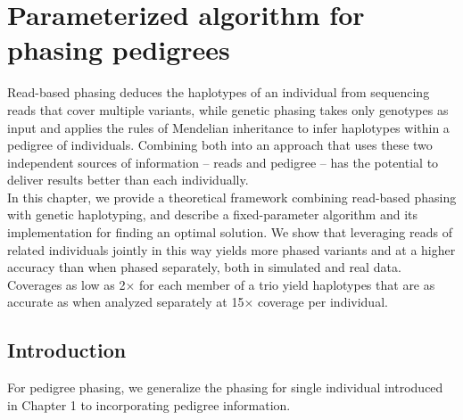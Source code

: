 \chapter{Parameterized algorithm for phasing pedigrees}
Read-based phasing deduces the haplotypes of an individual from sequencing reads that cover multiple variants, while genetic phasing takes only genotypes as input and applies the rules of Mendelian inheritance to infer haplotypes within a pedigree of individuals.
Combining both into an approach that uses these two independent sources of information -- reads and pedigree -- has the potential to deliver results better than each individually.\\

In this chapter, we provide a theoretical framework combining read-based phasing with genetic haplotyping, and describe a fixed-parameter algorithm and its implementation for finding an optimal solution.
We show that leveraging reads of related individuals jointly in this way yields more phased variants and at a higher accuracy than when phased separately, both in simulated and real data.
Coverages as low as 2$\times$ for each member of a trio yield haplotypes that are as accurate as when analyzed separately at 15$\times$ coverage per individual.

\section{Introduction}\label{sec:intro}
For pedigree phasing, we generalize the phasing for single individual introduced in Chapter 1 to incorporating pedigree information.

